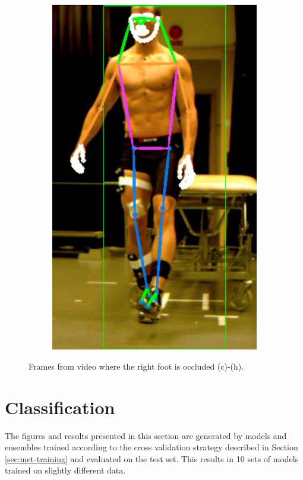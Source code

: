 {\begin{figure}[h]
\begin{subfigure}[t]{0.22\textwidth}
    \includegraphics[height=1.3\textwidth]{files/figs/res/hpe/36-8.png}
    \caption{}
  \end{subfigure}

  \caption{Frames from video where the right foot is occluded (c)-(h).}
  \label{fig:occluded}
\end{figure}
}

\FloatBarrier
\section{Classification}
The figures and results presented in this section are generated by models and ensembles trained according to the cross validation strategy described in Section \ref{sec:met-training} and evaluated on the test set. This results in 10 sets of models trained on slightly different data.

